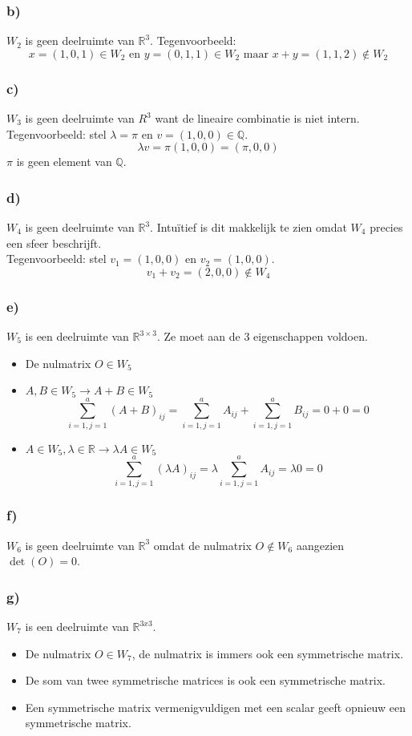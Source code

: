 \documentclass[lineaire_algebra_oplossingen.tex]{subfiles}
\begin{document}
\subsubsection*{b)}
$W_2$ is geen deelruimte van $\mathbb{R}^{3}$. Tegenvoorbeeld:
\[
x = (1,0,1) \in W_2 \text{ en } y = (0,1,1) \in W_2 \text{ maar } x + y = (1,1,2) \not \in W_2
\]

\subsubsection*{c)}
$W_3$ is geen deelruimte van $R^3$ want de lineaire combinatie is niet intern.\\
Tegenvoorbeeld: stel $\lambda = \pi$ en $v = (1,0,0) \in \mathbb{Q}$.
\[
\lambda v = \pi (1,0,0) = (\pi,0,0)
\]
$\pi$ is geen element van $\mathbb{Q}$.

\subsubsection*{d)}
$W_4$ is geen deelruimte van $\mathbb{R}^3$. Intu\"itief is dit makkelijk te zien omdat $W_4$ precies een sfeer beschrijft.\\
Tegenvoorbeeld: stel $v_1 = (1,0,0)$ en $v_2 =(1,0,0)$.
\[
v_1 + v_2 = (2,0,0) \not \in W_4
\]

\subsubsection*{e)}
$W_5$ is een deelruimte van $\mathbb{R}^{3 \times 3}$. Ze moet aan de 3 eigenschappen voldoen.
\begin{itemize}
\item De nulmatrix $O \in W_5$
\item $A,B \in W_5 \longrightarrow A+B \in W_5$
\[
\sum\limits_{i=1,j=1}^a (A+B)_{ij} = \sum\limits_{i=1,j=1}^a A_{ij} + \sum\limits_{i=1,j=1}^a B_{ij} = 0+0 = 0
\]
\item $ A \in W_5, \lambda \in \mathbb{R} \longrightarrow \lambda A \in W_5$
\[
\sum\limits_{i=1,j=1}^a (\lambda A)_{ij} = \lambda \sum\limits_{i=1,j=1}^a A_{ij} = \lambda 0 = 0
\]
\end{itemize}
\subsubsection*{f)}
$W_6$ is geen deelruimte van $\mathbb{R}^{3}$ omdat de nulmatrix $O \not \in W_6$ aangezien $\det(O) = 0$.

\subsubsection*{g)}
$W_7$ is een deelruimte van $\mathbb{R}^{3x3}$.
\begin{itemize}
\item De nulmatrix $O \in W_7$, de nulmatrix is immers ook een symmetrische matrix.
\item De som van twee symmetrische matrices is ook een symmetrische matrix.
\item Een symmetrische matrix vermenigvuldigen met een scalar geeft opnieuw een symmetrische matrix.
\end{itemize}
\end{document}

